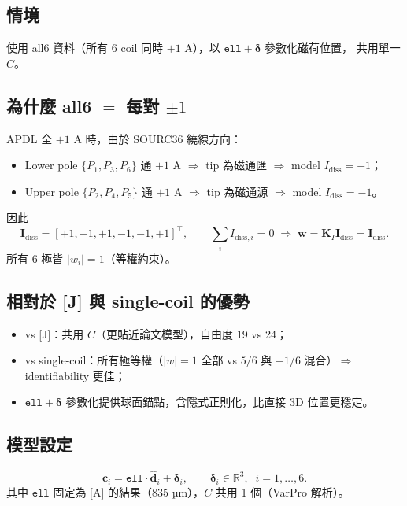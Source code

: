 \documentclass[11pt,a4paper]{article}
\newcommand{\KI}{\mathbf{K}_I}
\newcommand{\Idiss}{\mathbf{I}_{\mathrm{diss}}}
\newcommand{\cvec}{\mathbf{c}}
\newcommand{\dhat}{\hat{\mathbf{d}}}
\newcommand{\bdelta}{\bm{\delta}}
\begin{document}
\subsection{情境}

使用 all6 資料（所有 6 coil 同時 \(+1\) A），以 \(\texttt{ell} + \bdelta\) 參數化磁荷位置，
共用單一 \(C\)。

\subsection{為什麼 all6 \(=\) 每對 \(\pm 1\)}

APDL 全 \(+1\) A 時，由於 SOURC36 繞線方向：
\begin{itemize}[leftmargin=*]
\item Lower pole \(\{P_1, P_3, P_6\}\) 通 \(+1\) A \(\Rightarrow\) tip 為磁通匯 \(\Rightarrow\) model \(I_{\text{diss}} = +1\)；
\item Upper pole \(\{P_2, P_4, P_5\}\) 通 \(+1\) A \(\Rightarrow\) tip 為磁通源 \(\Rightarrow\) model \(I_{\text{diss}} = -1\)。
\end{itemize}
因此
\begin{equation}
\Idiss = [+1, -1, +1, -1, -1, +1]^\top, \qquad \sum_i I_{\text{diss},i} = 0
\;\Rightarrow\; \mathbf{w} = \KI \Idiss = \Idiss.
\end{equation}
所有 6 極皆 \(|w_i| = 1\)（等權約束）。

\subsection{相對於 [J] 與 single-coil 的優勢}

\begin{itemize}[leftmargin=*]
\item vs [J]：共用 \(C\)（更貼近論文模型），自由度 19 vs 24；
\item vs single-coil：所有極等權（\(|w|=1\) 全部 vs \(5/6\) 與 \(-1/6\) 混合）\(\Rightarrow\) identifiability 更佳；
\item \(\texttt{ell}+\bdelta\) 參數化提供球面錨點，含隱式正則化，比直接 3D 位置更穩定。
\end{itemize}

\subsection{模型設定}

\begin{equation}
\cvec_i = \texttt{ell} \cdot \dhat_i + \bdelta_i, \qquad \bdelta_i \in \mathbb{R}^3,\;\; i=1,\dots,6.
\end{equation}
其中 \(\texttt{ell}\) 固定為 [A] 的結果（\(835\) µm），\(C\) 共用 1 個（VarPro 解析）。
\end{document}

